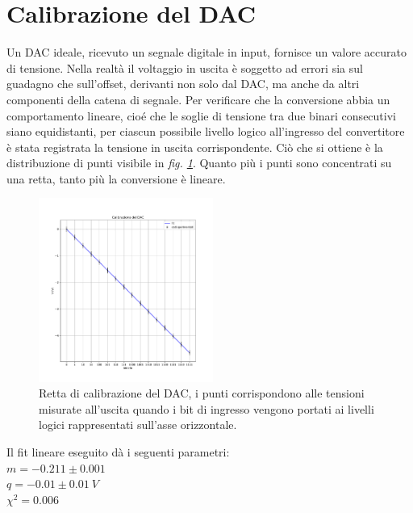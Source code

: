 \documentclass[journal]{IEEEtran}
\begin{document}

\section{Calibrazione del DAC}
Un DAC ideale, ricevuto un segnale digitale in input, fornisce un valore accurato di tensione. Nella realtà il voltaggio in uscita è soggetto ad errori sia sul guadagno che sull'offset, derivanti non solo dal DAC, ma anche da altri componenti della catena di segnale. 
Per verificare che la conversione abbia un comportamento lineare, cioé che le soglie di tensione tra due binari consecutivi siano equidistanti, per ciascun possibile livello logico all'ingresso del convertitore è stata registrata la tensione in uscita corrispondente. Ciò che si ottiene è la distribuzione di punti visibile in \textit{fig. \ref{fig:graph_calibrazione_dac}}. Quanto più i punti sono concentrati su una retta, tanto più la conversione è lineare. 

\begin{figure}[H]%
\centering
\begin{center}
\includegraphics[width=0.51\textwidth]{analysis/output/calibrazione_dac.pdf}
\end{center}
\caption{Retta di calibrazione del DAC, i punti corrispondono alle tensioni misurate all'uscita quando i bit di ingresso vengono portati ai livelli logici rappresentati sull'asse orizzontale.}
\label{fig:graph_calibrazione_dac}
\end{figure}

Il fit lineare eseguito dà i seguenti parametri: \\
$ m = -0.211 \pm 0.001 $ \\
$ q = -0.01 \pm 0.01 \ V $ \\
$ \chi^{2} = 0.006 $ 
\end{document}
